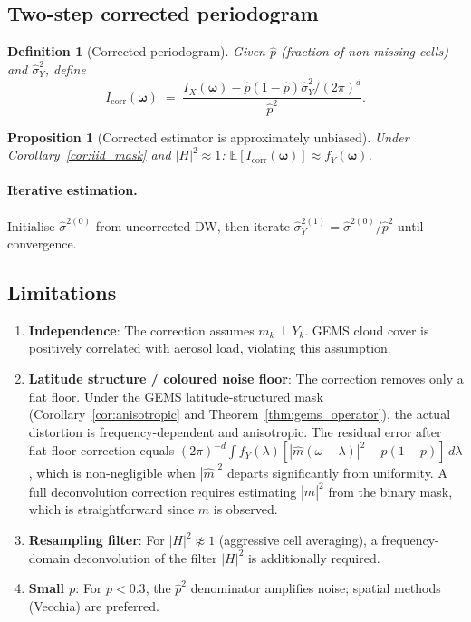 \documentclass[12pt]{article}
\newtheorem{proposition}{Proposition}
\newtheorem{definition}{Definition}
\begin{document}
\subsection{Two-step corrected periodogram}

\begin{definition}[Corrected periodogram]
Given $\hat{p}$ (fraction of non-missing cells) and $\hat{\sigma}^2_Y$,
define
\[
  I_{\mathrm{corr}}(\boldsymbol{\omega})
  \;=\; \frac{I_X(\boldsymbol{\omega})
             - \hat{p}(1-\hat{p})\hat{\sigma}^2_Y / (2\pi)^d}
             {\hat{p}^2}.
\]
\end{definition}

\begin{proposition}[Corrected estimator is approximately unbiased]
Under Corollary~\ref{cor:iid_mask} and $|H|^2 \approx 1$:
$\mathbb{E}[I_{\mathrm{corr}}(\boldsymbol{\omega})] \approx f_Y(\boldsymbol{\omega})$.
\end{proposition}

\paragraph{Iterative estimation.}
Initialise $\hat\sigma^{2(0)}$ from uncorrected DW, then iterate
$\hat\sigma^{2(1)}_Y = \hat\sigma^{2(0)}/\hat{p}^2$ until convergence.

\subsection{Limitations}

\begin{enumerate}
  \item \textbf{Independence}: The correction assumes $m_k \perp Y_k$.
        GEMS cloud cover is positively correlated with aerosol load,
        violating this assumption.
  \item \textbf{Latitude structure / coloured noise floor}:
        The correction removes only a flat floor.
        Under the GEMS latitude-structured mask (Corollary~\ref{cor:anisotropic}
        and Theorem~\ref{thm:gems_operator}), the actual distortion is
        frequency-dependent and anisotropic.
        The residual error after flat-floor correction equals
        $(2\pi)^{-d}\int f_Y(\lambda)[|\hat{m}(\omega-\lambda)|^2
        - p(1-p)]\,d\lambda$,
        which is non-negligible when $|\hat{m}|^2$ departs significantly
        from uniformity.
        A full deconvolution correction requires estimating $|\hat{m}|^2$
        from the binary mask, which is straightforward since $m$ is
        observed.
  \item \textbf{Resampling filter}: For $|H|^2 \not\approx 1$
        (aggressive cell averaging), a frequency-domain deconvolution
        of the filter $|H|^2$ is additionally required.
  \item \textbf{Small $p$}: For $p < 0.3$, the $\hat{p}^2$ denominator
        amplifies noise; spatial methods (Vecchia) are preferred.
\end{enumerate}
\end{document}
